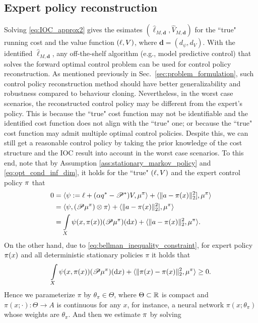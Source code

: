 \subsection{Expert policy reconstruction}\label{sec:policy-recovery}
Solving \eqref{eq:IOC_approx2} gives the esimates $(\hat{\ell}_{M,\mathbf{d}},\hat{V}_{M,\mathbf{d}})$ for the ``true" running cost and the value function $(\relax{\ell},\relax{V})$, where $\mathbf{d}=(d_\psi,d_V)$. 
With the identified $\hat{\ell}_{M,\mathbf{d}}$, any off-the-shelf algorithm (e.g., model predictive control) that solves the forward optimal control problem can be used for control policy reconstruction.
As mentioned previously in Sec.~\ref{sec:problem_formulation}, such control policy reconstruction method should have better generalizability and robustness compared to behaviour cloning.
Nevertheless, in the worst case scenarios,
the reconstructed control policy may be different from the expert's policy.
This is because the ``true" cost function may not be identifiable and the identified cost function does not align with the ``true" one; or because the ``true" cost function may admit multiple optimal control policies.
Despite this, we can still get a reasonable control policy by taking the prior knowledge of the cost structure and the IOC result into account in the worst case scenarios.
To this end, note that by Assumption \ref{ass:stationary_markov_policy} and \eqref{eq:opt_cond_inf_dim}, it holds for the ``true" $(\relax{\ell},\relax{V})$ and the expert control policy $\relax{\pi}$ that
\begin{align*}
0&=\langle \bar{\psi}:=\elltrue+(\alpha q^*-\proj^*)\Vtrue,\mu^{\pitrue}\rangle+ \langle \| a - \pitrue(x) \|_2^2],\mu^{\pitrue}\rangle\\
&=\langle \bar{\psi},(\proj \mu^{\pitrue})\otimes\pitrue\rangle+\langle \| a - \pitrue(x) \|_2^2],\mu^{\pitrue}\rangle\\
&=\int_X \bar{\psi}(x, \pitrue(x)) (\proj\mu^{\pitrue})(\mathrm{d}x) + \langle\| a - \pitrue(x) \|_2^2,\mu^{\pitrue}\rangle.
\end{align*}
On the other hand, due to \eqref{eq:bellman_inequality_constraint}, for expert policy $\relax{\pi}(x)$ and all deterministic stationary policies $\pi$ it holds that
\[
\int_X \bar{\psi}(x, \pi(x)) (\proj\mu^{\pitrue})(\mathrm{d}x) +\langle\| \pitrue(x) - \pi(x) \|_2^2,\mu^{\pitrue}\rangle\ge 0.
\]
Hence we parameterize $\pi$ by $\theta_\pi\in\Theta$, where $\Theta\subset\mathbb{R}$ is compact and $\pi(x;\cdot):\Theta\rightarrow A$ is continuous for any $x$, for instance, a neural network $\pi(x;\theta_\pi)$ whose weights are $\theta_\pi$. And then we estimate $\relax{\pi}$ by solving
